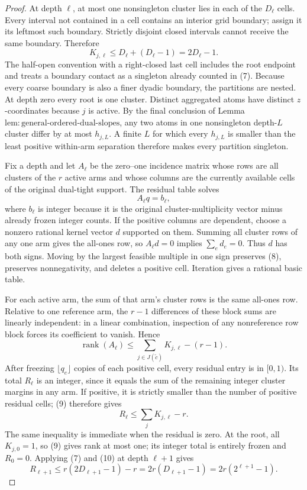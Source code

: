 \documentclass{article}
\begin{document}
\begin{proof}
At depth \(\ell\), at most one nonsingleton cluster lies in each of the \(D_\ell\) cells.  Every interval not contained in a cell contains an interior grid boundary; assign it its leftmost such boundary.  Strictly disjoint closed intervals cannot receive the same boundary.  Therefore
\[
 K_{j,\ell}\le D_\ell+(D_\ell-1)=2D_\ell-1. \tag{7}
\]
The half-open convention with a right-closed last cell includes the root endpoint and treats a boundary contact as a singleton already counted in (7).  Because every coarse boundary is also a finer dyadic boundary, the partitions are nested.  At depth zero every root is one cluster.  Distinct aggregated atoms have distinct \(z\)-coordinates because \(j\) is active.  By the final conclusion of Lemma \(\mathrm{lem{:}general\mbox{-}ordered\mbox{-}dual\mbox{-}slopes}\), any two atoms in one nonsingleton depth-\(L\) cluster differ by at most \(h_{j,L}\).  A finite \(L\) for which every \(h_{j,L}\) is smaller than the least positive within-arm separation therefore makes every partition singleton.

Fix a depth and let \(A_\ell\) be the zero--one incidence matrix whose rows are all clusters of the \(r\) active arms and whose columns are the currently available cells of the original dual-tight support.  The residual table solves
\[
 A_\ell q=b_\ell, \tag{8}
\]
where \(b_\ell\) is integer because it is the original cluster-multiplicity vector minus already frozen integer counts.  If the positive columns are dependent, choose a nonzero rational kernel vector \(d\) supported on them.  Summing all cluster rows of any one arm gives the all-ones row, so \(A_\ell d=0\) implies \(\sum_e d_e=0\).  Thus \(d\) has both signs.  Moving by the largest feasible multiple in one sign preserves (8), preserves nonnegativity, and deletes a positive cell.  Iteration gives a rational basic table.

For each active arm, the sum of that arm's cluster rows is the same all-ones row.  Relative to one reference arm, the \(r-1\) differences of these block sums are linearly independent: in a linear combination, inspection of any nonreference row block forces its coefficient to vanish.  Hence
\[
 \operatorname{rank}(A_\ell)
 \le\sum_{j\in J(\widetilde c)}K_{j,\ell}-(r-1). \tag{9}
\]
After freezing \(\lfloor q_e\rfloor\) copies of each positive cell, every residual entry is in \([0,1)\).  Its total \(R_\ell\) is an integer, since it equals the sum of the remaining integer cluster margins in any arm.  If positive, it is strictly smaller than the number of positive residual cells; (9) therefore gives
\[
 R_\ell\le\sum_jK_{j,\ell}-r. \tag{10}
\]
The same inequality is immediate when the residual is zero.  At the root, all \(K_{j,0}=1\), so (9) gives rank at most one; its integer total is entirely frozen and \(R_0=0\).  Applying (7) and (10) at depth \(\ell+1\) gives
\[
 R_{\ell+1}
 \le r(2D_{\ell+1}-1)-r
 =2r(D_{\ell+1}-1)
 =2r(2^{\ell+1}-1). \tag{11}
\]


\end{proof}
\end{document}
